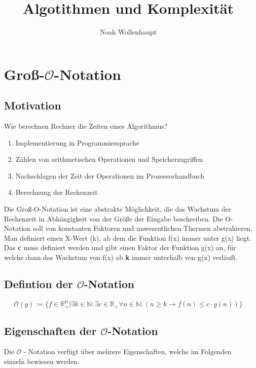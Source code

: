 \documentclass[12px,a4paper]{article}
\title{Algotithmen und Komplexität \cite{Stroetmann:Genius}}
\author{Noah Wollenhaupt}
\begin{document}
\maketitle
\newpage
\tableofcontents
\newpage

\section{Groß-$\mathcal{O}$-Notation}
\subsection{Motivation}
Wie berechnen Rechner die Zeiten eines Algorithmus?
\begin{enumerate}
	\item Implementierung in Programmiersprache 
	\item Zählen von arithmetischen Operationen und Speicherzugriffen
	\item Nachschlagen der Zeit der Operationen im Prozessorhandbuch
	\item Berechnung der Rechenzeit

\end{enumerate} 

\setlength{\parindent}{0pt} 
Die Groß-O-Notation ist eine abstrakte Möglichkeit, die das Wachstum der Rechenzeit in Abhängigkeit von der Größe der Eingabe beschreiben. Die O-Notation soll von konstanten Faktoren und unwesentlichen Thermen abstrahieren. Man definiert einen X-Wert (k), ab dem die Funktion f(x) immer unter g(x) liegt. Das \textbf{c} muss  definiert werden und gibt einen Faktor der Funktion g(x) an, für welche dann das Wachstum von f(x) ab \textbf{k}  immer unterhalb von g(x) verläuft. \\

\subsection{Defintion der $\mathcal{O}$-Notation}
$$\mathcal{O} (g) := \{ f \in \mathbb{R}_+^{\mathbb{N}} | \exists k \in \mathbb{N} : \exists c \in \mathbb{R}_+ \forall n \in \mathbb{N} : (n \geq k \rightarrow f(n) \leq c \cdot g(n) ) \}$$

\subsection{Eigenschaften der $\mathcal{O}$-Notation}
	Die $\mathcal{O}$ - Notation verfügt über mehrere Eigenschaften, welche im 
	Folgenden einzeln bewiesen werden. 
\end{document}

